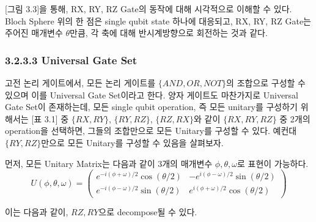 [그림 3.3]을 통해, RX, RY, RZ Gate의 동작에 대해 시각적으로 이해할 수 있다. Bloch Sphere 위의 한 점은 single qubit state 하나에 대응되고, RX, RY, RZ Gate는 주어진 매개변수 \(\theta\)만큼, 각 축에 대해 반시계방향으로 회전하는 것과 같다.

\subsubsection{3.2.3.3 \quad Universal Gate Set}
고전 논리 게이트에서, 모든 논리 게이트를 \(\{AND, OR, NOT\}\)의 조합으로 구성할 수 있으며 이를 Universal Gate Set이라고 한다. 양자 게이트도 마찬가지로 Universal Gate Set이 존재하는데, 모든 single qubit operation, 즉 모든 unitary를 구성하기 위해서는 [표 3.1] 중 \(\{RX, RY\}\), \(\{RY, RZ\}\), \(\{RZ, RX\}\)와 같이 \(\{RX, RY, RZ\}\) 중 2개의 operation을 선택하면, 그들의 조합만으로 모든 Unitary를 구성할 수 있다. 예컨대 \(\{RY, RZ\}\)만으로 모든 Unitary를 구성할 수 있음을 살펴보자.

\noindent 먼저, 모든 Unitary Matrix는 다음과 같이 3개의 매개변수 \(\phi, \theta, \omega\)로 표현이 가능하다.
\[
U(\phi, \theta, \omega) = \left( \begin{matrix}
 e^{-i(\phi + \omega)/2}\cos(\theta/2) & {-e^{i(\phi - \omega)/2}\sin(\theta/2) }
\\
 e^{-i(\phi - \omega)/2}\sin(\theta/2) & {e^{i(\phi + \omega)/2}\cos(\theta/2) }
\end{matrix}
\right)
\]

\noindent 이는 다음과 같이, \(RZ, RY\)으로 decompose될 수 있다.

